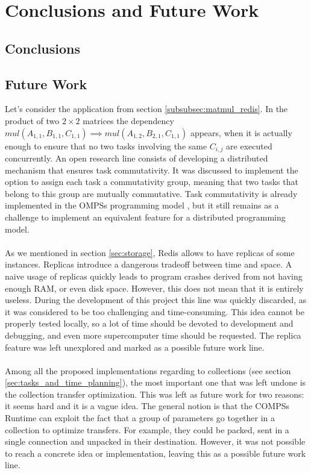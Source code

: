 \section{Conclusions and Future Work}
\subsection{Conclusions}
\label{subsec:conclusions}

\subsection{Future Work}
\label{subsec:future_work}

Let's consider the application from section \ref{subsubsec:matmul_redis}. In the product of two $2 \times 2$ matrices the dependency $mul(A_{1, 1}, B_{1, 1}, C_{1, 1}) \implies mul(A_{1,2}, B_{2, 1}, C_{1, 1})$ appears, when it is actually enough to ensure that no two tasks involving the same $C_{i, j}$ are executed concurrently. An open research line consists of developing a distributed mechanism that ensures task commutativity. It was discussed to implement the option to assign each task a commutativity group, meaning that two tasks that belong to this group are mutually commutative. Task commutativity is already implemented in the OMPSs programming model \cite{duran2011ompss}, but it still remains as a challenge to implement an equivalent feature for a distributed programming model.\\
\\
As we mentioned in section \ref{sec:storage}, Redis allows to have replicas of some instances. Replicas introduce a dangerous tradeoff between time and space. A naive usage of replicas quickly leads to program crashes derived from not having enough RAM, or even disk space. However, this does not mean that it is entirely useless. During the development of this project this line was quickly discarded, as it was considered to be too challenging and time-consuming. This idea cannot be properly tested locally, so a lot of time should be devoted to development and debugging, and even more supercomputer time should be requested. The replica feature was left unexplored and marked as a possible future work line.\\
\\
Among all the proposed implementations regarding to collections (see section \ref{sec:tasks_and_time_planning}), the most important one that was left undone is the collection transfer optimization. This was left as future work for two reasons: it seems hard and it is a vague idea. The general notion is that the COMPSs Runtime can exploit the fact that a group of parameters go together in a collection to optimize transfers. For example, they could be packed, sent in a single connection and unpacked in their destination. However, it was not possible to reach a concrete idea or implementation, leaving this as a possible future work line.\\
